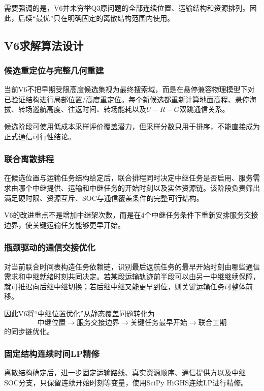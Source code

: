 \documentclass[UTF8,a4paper,12pt]{ctexart}
\begin{document}
需要强调的是，V6并未穷举Q3原问题的全部连续位置、运输结构和资源排列。因此，后续“最优”只在明确固定的离散结构范围内使用。

\subsection{V6求解算法设计}

\subsubsection{候选重定位与完整几何重建}

当前V6不把早期受限高度候选集视为最终搜索域，而是在悬停兼容物理模型下对已验证结构进行局部位置/高度重定位。每个新候选都重新计算地面高程、悬停海拔、转场巡航高度、往返时间、转场能耗以及$U-R-G$双跳通信关系。

候选阶段可使用低成本采样评价覆盖潜力，但采样分数只用于排序，不能直接成为正式通信可行性结论。

\subsubsection{联合离散排程}

在候选位置与运输任务结构给定后，联合排程同时决定中继任务是否启用、服务需求由哪个中继提供、运输和中继任务的开始时刻以及实体资源链。该阶段负责筛出满足硬时限、资源互斥、SOC与通信覆盖条件的完整可行结构。

V6的改进重点不是增加中继架次数，而是在4个中继任务条件下重新安排服务交接边界，使关键运输任务能够更早开始。

\subsubsection{瓶颈驱动的通信交接优化}

对当前联合时间表构造任务依赖链，识别最后返航任务的最早开始时刻由哪些通信需求和中继就绪时刻共同决定。若某段运输轨迹前半段可以由另一中继继续保障，就可推迟向后继中继切换；若后继中继又能更早到位，则关键运输任务可整体前移。

因此V6将“中继位置优化”从静态覆盖问题转化为
\[
\boxed{
\text{中继位置}
\rightarrow
\text{服务交接边界}
\rightarrow
\text{关键任务最早开始}
\rightarrow
\text{联合工期}
}
\]
的同步链优化。

\subsubsection{固定结构连续时间LP精修}

离散结构确定后，进一步固定运输路线、真实资源顺序、通信提供方以及中继SOC分支，只保留连续开始时刻等变量，使用SciPy HiGHS连续LP进行精修。
\end{document}
